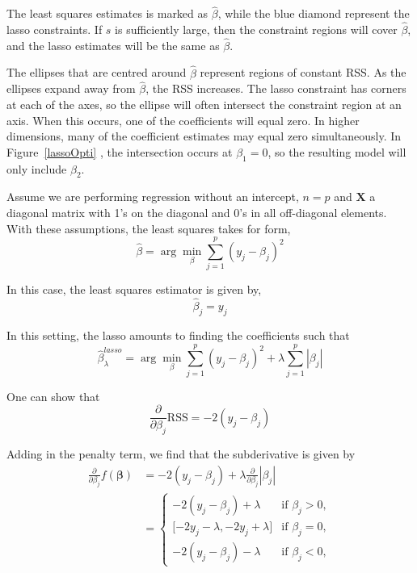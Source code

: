 \documentclass[12pt,a4paper]{article}%
\theoremstyle{definition}
\theoremstyle{plain}
\numberwithin{equation}{section}
\newcounter{subsubsubsection}[subsubsection]
\begin{document}
The least squares estimates is marked as $\hat{\beta}$, while the blue diamond represent the lasso constraints. 
If $s$ is sufficiently large, then the constraint regions will cover $\hat{\beta}$, and the lasso estimates will be the same as $\hat{\beta}$. 

The ellipses that are centred around $\hat{\beta}$ represent regions of constant RSS. As the ellipses expand away from $\hat{\beta}$, the RSS increases. 
The lasso constraint has corners at each of the axes, so the ellipse will often intersect the constraint region at an axis. When this occurs, one of the coefficients will equal zero. 
In higher dimensions, many of the coefficient estimates may equal zero simultaneously. 
In Figure~\ref{lassoOpti} , the intersection occurs at $\beta_{1}=0$, so the resulting model will only include $\beta_{2}$.


\subsubsubsection{\textcolor{blue}{A simple case for the Lasso}}
Assume we are performing regression without an intercept, $n=p$ and $\mathbf{X}$ a diagonal matrix with 1's on the diagonal and 0's in all off-diagonal elements.
With these assumptions, the least squares takes for form,
\begin{equation}
\hat{\beta} = \arg\min_{\beta} \sum\limits_{j=1}^{p} (y_{j}-\beta_{j})^{2}
\end{equation}


In this case, the least squares estimator is given by,
\begin{equation*}
\hat{\beta}_{j} = y_{j}
\end{equation*}

In this setting, the lasso amounts to finding the coefficients such that
\begin{equation}
\hat{\beta}_{\lambda}^{lasso} = \arg\min_{\beta} \sum\limits_{j=1}^{p} (y_{j}-\beta_{j})^{2} + \lambda \sum\limits_{j=1}^{p} |\beta_{j}|
\end{equation}

One can show that
\begin{equation}
\frac{\partial}{\partial \beta_{j}} \text{RSS} = -2(y_{j}-\beta_{j})
\end{equation}

Adding in the penalty term, we find that the subderivative is given by
\begin{align*}
\frac{\partial}{\partial \beta_{j}} f(\boldsymbol{\beta}) &= -2(y_{j}-\beta_{j}) + \lambda \frac{\partial}{\partial \beta_{j}} |\beta_{j}| \\
													      &= \left\{
\begin{array}{ll}
-2(y_{j}-\beta_{j})+\lambda & \mbox{if } \beta_{j} > 0, \\
{[}-2y_{j}-\lambda,-2y_{j}+\lambda{]} & \mbox{if } \beta_{j} = 0, \\
-2(y_{j}-\beta_{j})-\lambda & \mbox{if } \beta_{j} < 0,
\end{array} \right.
\end{align*}
\end{document}
